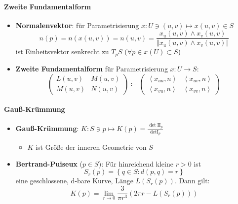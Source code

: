 \paragraph{Zweite Fundamentalform}
\begin{itemize}
  \item \textbf{Normalenvektor}: für Parametrisierung \( x: U \ni (u,v) \mapsto x(u,v) \in S \)
  \begin{equation*}
    n(p) = n(x(u,v)) = n(u,v) = \frac{x_u(u,v) \wedge x_v(u,v)}{\left\Vert x_u(u,v) \wedge x_v(u,v) \right\Vert}
  \end{equation*}
  ist Einheitsvektor senkrecht zu \( T_p S \) (\( \forall p \in x(U) \subset S \))
  \item \textbf{Zweite Fundamentalform} für Parametrisierung \( x: U \to S \):
  \begin{equation*}
    \left( \begin{smallmatrix}
      L(u,v) & M(u,v) \\ M(u,v) & N(u,v)
    \end{smallmatrix} \right) \coloneqq \left( \begin{smallmatrix}
      \left\langle x_{uu}, n \right\rangle & \left\langle x_{uv}, n \right\rangle \\
      \left\langle x_{vu},n \right\rangle & \left\langle x_{vv},n \right\rangle
    \end{smallmatrix} \right)
  \end{equation*}
\end{itemize}

\paragraph{Gauß-Krümmung}
\begin{itemize}
  \item \textbf{Gauß-Krümmung}: \( K: S \ni p \mapsto K(p) = \frac{\det \text{II}_p}{\text{det}\text{I}_p} \)
  \begin{itemize}
    \item \( K \) ist Größe der inneren Geometrie von \( S \)
  \end{itemize}
  \item \textbf{Bertrand-Puiseux} (\( p \in S \)): Für hinreichend kleine \( r > 0 \) ist
  \begin{equation*}
    S_r(p) = \left \{ q \in S : d(p,q) = r \right \}
  \end{equation*}
  eine geschlossene, d-bare Kurve, Länge \( L(S_r(p)) \). Dann gilt:
  \begin{equation*}
    K(p) = \lim_{r \to 0} \frac{3}{\pi r^3}(2\pi r - L(S_r(p)))
  \end{equation*}
\end{itemize}

